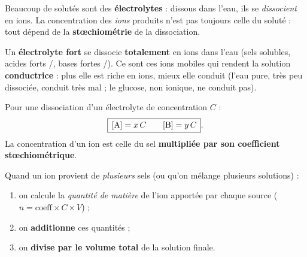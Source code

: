 \documentclass[11pt,a4paper]{article}
\begin{document}
\noindent
Beaucoup de solutés sont des \textbf{électrolytes} : dissous dans l'eau, ils se \emph{dissocient} en
ions. La concentration des \emph{ions} produits n'est pas toujours celle du soluté : tout dépend de la
\textbf{stœchiométrie} de la dissociation.

\begin{cle}
Un \textbf{électrolyte fort} se dissocie \textbf{totalement} en ions dans l'eau (sels solubles,
acides forts /, bases fortes /). Ce sont ces ions mobiles qui
rendent la solution \textbf{conductrice} : plus elle est riche en ions, mieux elle conduit (l'eau
pure, très peu dissociée, conduit très mal ; le glucose, non ionique, ne conduit pas).
\end{cle}

\begin{cle}
Pour une dissociation  d'un électrolyte de concentration $C$ :
\[ \boxed{\,[\ce{A}] = x\,C \qquad [\ce{B}] = y\,C\,}. \]
La concentration d'un ion est celle du sel \textbf{multipliée par son coefficient stœchiométrique}.
\end{cle}

\begin{center}
\end{center}

\begin{methode}
Quand un ion provient de \emph{plusieurs} sels (ou qu'on mélange plusieurs solutions) :
\begin{enumerate}[leftmargin=1.5em,topsep=1pt,itemsep=1pt]
  \item on calcule la \emph{quantité de matière} de l'ion apportée par chaque source
        ($n = \text{coeff}\times C\times V$) ;
  \item on \textbf{additionne} ces quantités ;
  \item on \textbf{divise par le volume total} de la solution finale.
\end{enumerate}
\end{methode}
\end{document}
